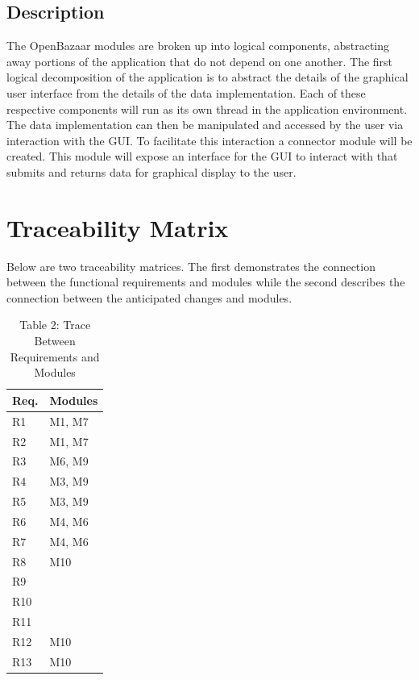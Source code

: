 \documentclass{article}
\begin{document}
\subsection*{Description}
The OpenBazaar modules are broken up into logical components, abstracting away portions of the application that do not depend on one another. The first logical decomposition of the application is to abstract the details of the graphical user interface from the details of the data implementation. Each of these respective components will run as its own thread in the application environment. The data implementation can then be manipulated and accessed by the user via interaction with the GUI. To facilitate this interaction a connector module will be created. This module will expose an interface for the GUI to interact with that submits and returns data for graphical display to the user.



\section*{Traceability Matrix}

Below are two traceability matrices. The first demonstrates the connection between the functional requirements and modules while the second describes the connection between the anticipated changes and modules.

\begin{table}[]
	\centering
	\begin{tabular}{p{} p{}}
		\toprule
		\textbf{Req.} & \textbf{Modules}\\
		\midrule
		R1 & M1, M7\\
		R2 & M1, M7\\
		R3 & M6, M9\\
		R4 & M3, M9\\
		R5 & M3, M9\\
		R6 & M4, M6\\
		R7 & M4, M6\\
		R8 & M10\\
		R9 & \\ %
		R10 & \\ %
		R11 & \\ %
		R12 & M10\\
		R13 & M10\\
		\bottomrule
	\end{tabular}
	\caption{Table 2: Trace Between Requirements and Modules}
	
\end{table}
\end{document}
